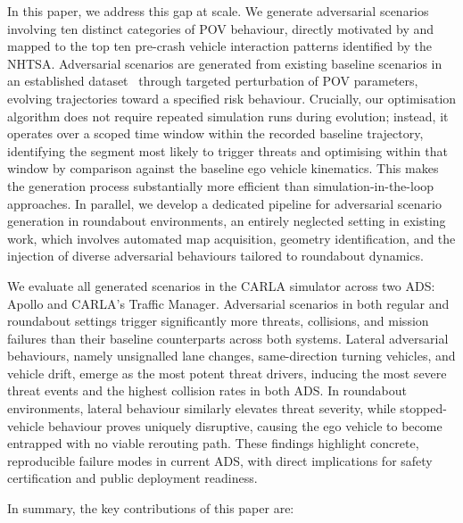 \documentclass[sigconf,review,anonymous]{acmart}
\begin{document}
In this paper, we address this gap at scale. We generate adversarial scenarios involving ten distinct categories of POV behaviour, directly motivated by and mapped to the top ten pre-crash vehicle interaction patterns identified by the NHTSA. Adversarial scenarios are generated from existing baseline scenarios in an established dataset~\cite{dai_sctrans_2024} through targeted perturbation of POV parameters, evolving trajectories toward a specified risk behaviour. Crucially, our optimisation algorithm does not require repeated simulation runs during evolution; instead, it operates over a scoped time window within the recorded baseline trajectory, identifying the segment most likely to trigger threats and optimising within that window by comparison against the baseline ego vehicle kinematics. This makes the generation process substantially more efficient than simulation-in-the-loop approaches. In parallel, we develop a dedicated pipeline for adversarial scenario generation in roundabout environments, an entirely neglected setting in existing work, which involves automated map acquisition, geometry identification, and the injection of diverse adversarial behaviours tailored to roundabout dynamics.

We evaluate all generated scenarios in the CARLA simulator across two ADS: Apollo and CARLA's Traffic Manager. Adversarial scenarios in both regular and roundabout settings trigger significantly more threats, collisions, and mission failures than their baseline counterparts across both systems. Lateral adversarial behaviours, namely unsignalled lane changes, same-direction turning vehicles, and vehicle drift, emerge as the most potent threat drivers, inducing the most severe threat events and the highest collision rates in both ADS. In roundabout environments, lateral behaviour similarly elevates threat severity, while stopped-vehicle behaviour proves uniquely disruptive, causing the ego vehicle to become entrapped with no viable rerouting path. These findings highlight concrete, reproducible failure modes in current ADS, with direct implications for safety certification and public deployment readiness.

In summary, the key contributions of this paper are:
\end{document}
